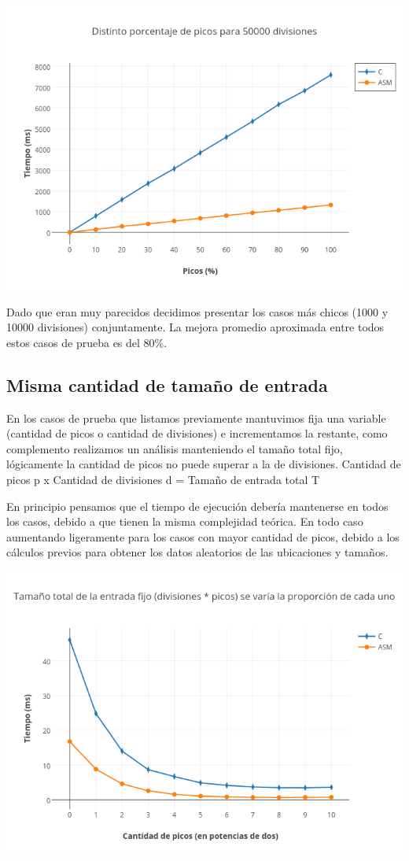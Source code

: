 \includegraphics[scale=0.6]{imagenes/distintosPicos50000divisiones.png} 

Dado que eran muy parecidos decidimos presentar los casos más chicos (1000 y 10000 divisiones) conjuntamente. La mejora promedio aproximada entre todos estos casos de prueba es del 80$\%$.

\newpage
\subsection{Misma cantidad de tamaño de entrada}

En los casos de prueba que listamos previamente mantuvimos fija una variable (cantidad de picos o cantidad de divisiones) e incrementamos la restante, como complemento realizamos un análisis manteniendo el tamaño total fijo, lógicamente la cantidad de picos no puede superar a la de divisiones.
Cantidad de picos p x Cantidad de divisiones d = Tamaño de entrada total T

En principio pensamos que el tiempo de ejecución debería mantenerse en todos los casos, debido a que tienen la misma complejidad teórica. En todo caso aumentando ligeramente para los casos con mayor cantidad de picos, debido a los cálculos previos para obtener los datos aleatorios de las ubicaciones y tamaños.

\includegraphics[scale=0.6]{imagenes/tamanioTotalFijo.png} 

